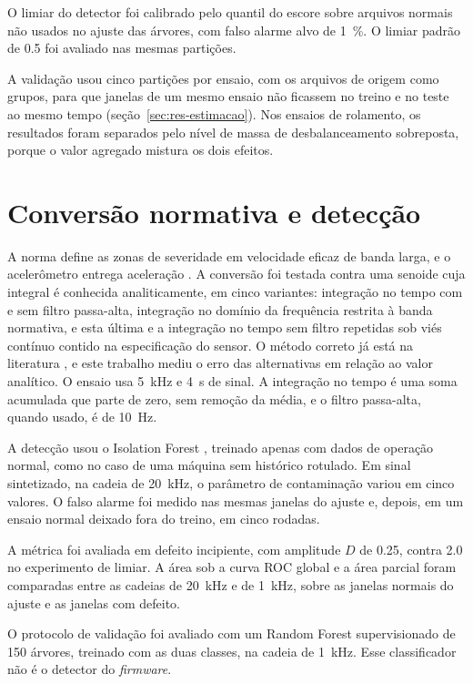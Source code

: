 O limiar do detector foi calibrado pelo quantil do escore sobre arquivos normais não usados no
ajuste das árvores, com falso alarme alvo de \SI{1}{\percent}. O limiar padrão de \num{0,5} foi
avaliado nas mesmas partições.

A validação usou cinco partições por ensaio, com os arquivos de origem como grupos, para
que janelas de um mesmo ensaio não ficassem no treino e no teste ao mesmo tempo
(seção~\ref{sec:res-estimacao}). Nos ensaios de rolamento, os resultados foram separados
pelo nível de massa de desbalanceamento sobreposta, porque o valor agregado mistura os dois
efeitos.

\section{Conversão normativa e detecção}
\label{sec:dev-estimacao}

A norma define as zonas de severidade em velocidade eficaz de banda larga, e o acelerômetro
entrega aceleração \cite{iso208163_2022}. A conversão foi testada contra uma senoide cuja
integral é conhecida analiticamente, em cinco variantes: integração no tempo com e sem
filtro passa-alta, integração no domínio da frequência restrita à banda normativa, e esta
última e a integração no tempo sem filtro repetidas sob viés contínuo contido na
especificação do sensor. O método correto já está na literatura \cite{brandt2014}, e este
trabalho mediu o erro das alternativas em relação ao valor analítico. O ensaio usa
\SI{5}{\kilo\hertz} e \SI{4}{\second} de sinal. A integração no tempo é uma soma acumulada que parte
de zero, sem remoção da média, e o filtro passa-alta, quando usado, é de \SI{10}{\hertz}.

A detecção usou o Isolation Forest \cite{liu2008}, treinado apenas com dados de operação normal,
como no caso de uma máquina sem histórico rotulado. Em sinal sintetizado, na cadeia de
\SI{20}{\kilo\hertz}, o parâmetro de contaminação variou em cinco valores. O falso alarme foi medido
nas mesmas janelas do ajuste e, depois, em um ensaio normal deixado fora do treino, em cinco rodadas.

A métrica foi avaliada em defeito incipiente, com amplitude $D$ de \num{0,25}, contra \num{2,0} no
experimento de limiar. A área sob a curva ROC global e a área parcial \cite{koizumi2020} foram
comparadas entre as cadeias de \SI{20}{\kilo\hertz} e de \SI{1}{\kilo\hertz}, sobre as janelas
normais do ajuste e as janelas com defeito.

O protocolo de validação foi avaliado com um Random Forest supervisionado de \num{150} árvores,
treinado com as duas classes, na cadeia de \SI{1}{\kilo\hertz}. Esse classificador não é o detector
do \emph{firmware}.

